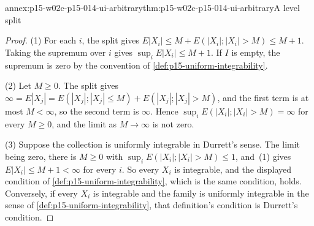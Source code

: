 \begin{annexitem}{annex:p15-w02c-p15-014-ui-arbitrary}{thm:p15-w02c-p15-014-ui-arbitrary}{A level split}
\begin{proof}
(1) For each \(i\), the split gives
\(E|X_i|\leq M+E(|X_i|;|X_i|>M)\leq M+1\). Taking the supremum over
\(i\) gives \(\sup_iE|X_i|\leq M+1\). If \(I\) is empty, the supremum is
zero by the convention of \cref{def:p15-uniform-integrability}.

(2) Let \(M\geq0\). The split gives
\(\infty=E|X_j|=E(|X_j|;|X_j|\leq M)+E(|X_j|;|X_j|>M)\), and the first
term is at most \(M<\infty\), so the second term is \(\infty\). Hence
\(\sup_iE(|X_i|;|X_i|>M)=\infty\) for every \(M\geq0\), and the limit as
\(M\to\infty\) is not zero.

(3) Suppose the collection is uniformly integrable in Durrett's sense.
The limit being zero, there is \(M\geq0\) with
\(\sup_iE(|X_i|;|X_i|>M)\leq1\), and~(1) gives \(E|X_i|\leq M+1<\infty\)
for every \(i\). So every \(X_i\) is integrable, and the displayed
condition of \cref{def:p15-uniform-integrability}, which is the same
condition, holds. Conversely, if every \(X_i\) is integrable and the
family is uniformly integrable in the sense of
\cref{def:p15-uniform-integrability}, that definition's condition is
Durrett's condition.
\end{proof}
\end{annexitem}

